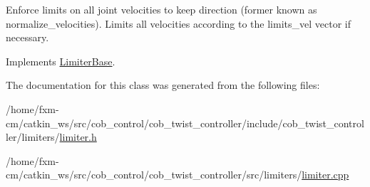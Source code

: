 Enforce limits on all joint velocities to keep direction (former known as normalize\-\_\-velocities). Limits all velocities according to the limits\-\_\-vel vector if necessary. 

Implements \hyperlink{classLimiterBase_a1755edebc0cacfd79f945852ead8ae04}{Limiter\-Base}.



The documentation for this class was generated from the following files\-:\begin{DoxyCompactItemize}
\item 
/home/fxm-\/cm/catkin\-\_\-ws/src/cob\-\_\-control/cob\-\_\-twist\-\_\-controller/include/cob\-\_\-twist\-\_\-controller/limiters/\hyperlink{limiter_8h}{limiter.\-h}\item 
/home/fxm-\/cm/catkin\-\_\-ws/src/cob\-\_\-control/cob\-\_\-twist\-\_\-controller/src/limiters/\hyperlink{limiter_8cpp}{limiter.\-cpp}\end{DoxyCompactItemize}
